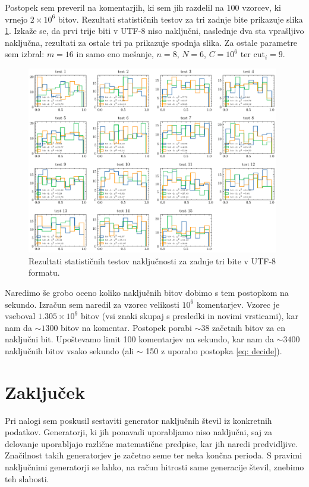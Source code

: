\documentclass[11pt, oneside]{article}
\theoremstyle{definition}
\begin{document}
Postopek sem preveril na komentarjih, ki sem jih razdelil na $100$ vzorcev, ki vrnejo $2 \times 10^6$ bitov.
Rezultati statističnih testov za tri zadnje bite prikazuje slika \ref{fig: text_rng_results}.
Izkaže se, da prvi trije biti v UTF-8 niso naključni, naslednje dva sta vprašljivo naključna, rezultati
za ostale tri pa prikazuje spodnja slika. Za ostale parametre sem izbral: $m=16$ in samo eno mešanje, $n=8$,
$N=6$, $C=10^6$ ter $\text{cut}_i=9$.

\begin{figure}[h!]
    \centering
    \includegraphics[width=0.98\textwidth]{text_rng_p_dists.pdf}
    \caption{Rezultati statističnih testov naključnosti za zadnje tri bite v UTF-8 formatu.}
    \label{fig: text_rng_results}
\end{figure}

\newpage
Naredimo še grobo oceno koliko naključnih bitov dobimo s tem postopkom na sekundo.
Izračun sem naredil za vzorec velikosti $10^6$ komentarjev. Vzorec je vseboval $1.305\times 10^9$ bitov (vsi znaki skupaj s presledki in novimi vrsticami), kar nam da
$\sim1300$ bitov na komentar. Postopek porabi $\sim 38$ začetnih bitov za en naključni bit. Upoštevamo limit
100 komentarjev na sekundo, kar nam da $\sim 3400$ naključnih bitov vsako sekundo (ali $\sim$ 150 z uporabo postopka \ref{eq: decide}).

\section{Zaključek}
Pri nalogi sem poskusil sestaviti generator naključnih števil iz konkretnih podatkov.
Generatorji, ki jih ponavadi uporabljamo niso naključni, saj za delovanje uporabljajo različne matematične
predpise, kar jih naredi predvidljive. Značilnost takih generatorjev je začetno seme ter neka končna perioda. S pravimi naključnimi
generatorji se lahko, na račun hitrosti same generacije števil, znebimo teh slabosti.
\end{document}
